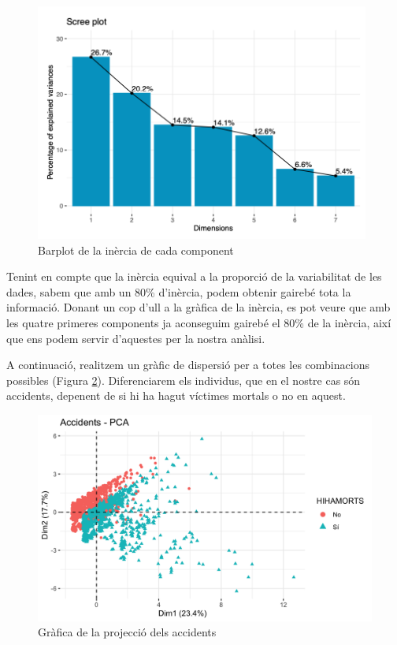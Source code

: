 \documentclass[12pt,longbibliography]{article}
\theoremstyle{definition}
\theoremstyle{remark}
\begin{document}
\begin{figure}[H]
\begin{center}
\includegraphics[width=11cm]{acp2}
\end{center}
\caption{Barplot de la inèrcia de cada component}
\label{fig:ACP2}
\end{figure}


Tenint en compte que la inèrcia equival a la proporció de la variabilitat de les dades, sabem que amb un 80\% d'inèrcia, podem obtenir gairebé tota la informació. Donant un cop d'ull a la gràfica de la inèrcia, es pot veure que amb les quatre primeres components ja aconseguim gairebé el 80\% de la inèrcia, així que ens podem servir d'aquestes per la nostra anàlisi.



A continuació, realitzem un gràfic de dispersió per a totes les combinacions possibles (Figura \ref{fig:ACP3}). Diferenciarem els individus, que en el nostre cas són accidents, depenent de si hi ha hagut víctimes mortals o no en aquest. 

\begin{figure}[H]
\begin{center}
\includegraphics[width=15cm]{acp3}
\end{center}
\caption{Gràfica de la projecció dels accidents}
\label{fig:ACP3}
\end{figure}
\end{document}
